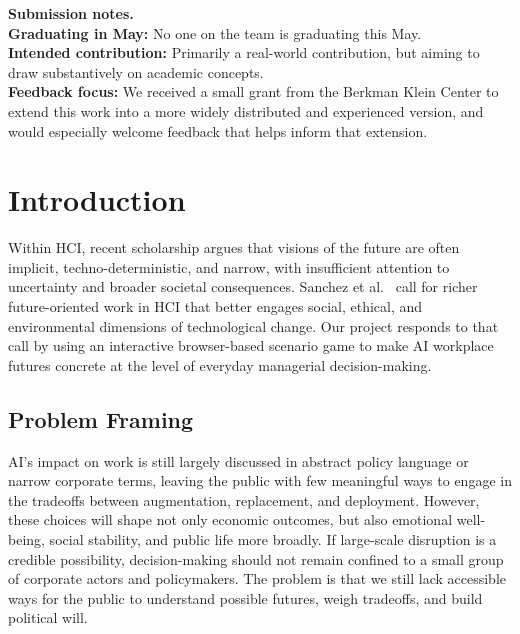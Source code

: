 \documentclass[sigconf,authordraft]{acmart}
\begin{document}
\maketitle

\begingroup
\small
\noindent\textbf{Submission notes.}\\
\textbf{Graduating in May:} No one on the team is graduating this May.\\
\textbf{Intended contribution:} Primarily a real-world contribution, but aiming to draw substantively on academic concepts.\\
\textbf{Feedback focus:} We received a small grant from the Berkman Klein Center to extend this work into a more widely distributed and experienced version, and would especially welcome feedback that helps inform that extension.
\endgroup
\vspace{0.5em}

\section{Introduction}

Within HCI, recent scholarship argues that visions of the future are often implicit, techno-deterministic, and narrow, with insufficient attention to uncertainty and broader societal consequences. Sanchez et al.~\cite{sanchez2025talk} call for richer future-oriented work in HCI that better engages social, ethical, and environmental dimensions of technological change. Our project responds to that call by using an interactive browser-based scenario game to make AI workplace futures concrete at the level of everyday managerial decision-making.


\subsection{Problem Framing}


AI's impact on work is still largely discussed in abstract policy language or narrow corporate terms, leaving the public with few meaningful ways to engage in the tradeoffs between augmentation, replacement, and deployment. However, these choices will shape not only economic outcomes, but also emotional well-being, social stability, and public life more broadly. If large-scale disruption is a credible possibility, decision-making should not remain confined to a small group of corporate actors and policymakers. The problem is that we still lack accessible ways for the public to understand possible futures, weigh tradeoffs, and build political will.
\end{document}
